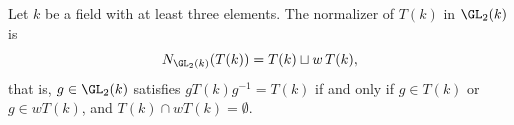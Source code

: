 Let $k$ be a field with at least three elements. The normalizer of $T(k)$ in $\GL_2(k)$ is
\[
  N_{\GL_2(k)}(T(k))=T(k)\sqcup w\,T(k),
\]
that is, $g\in\GL_2(k)$ satisfies $gT(k)g^{-1}=T(k)$ if and only if $g\in T(k)$ or $g\in wT(k)$, and
$T(k)\cap wT(k)=\emptyset$.
